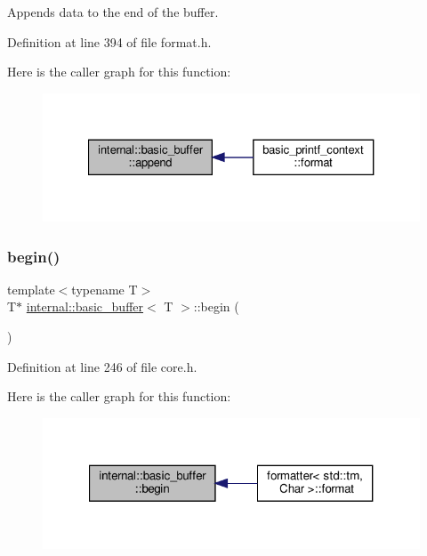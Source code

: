 Appends data to the end of the buffer. 

Definition at line 394 of file format.\+h.

Here is the caller graph for this function\+:
\nopagebreak
\begin{figure}[H]
\begin{center}
\leavevmode
\includegraphics[width=327pt]{classinternal_1_1basic__buffer_aba7ea1a95a28bc123712f2fd24cf7414_icgraph}
\end{center}
\end{figure}
\mbox{\label{classinternal_1_1basic__buffer_ae9d79a4d8c58625f46dfc48e95091bb4}} 
\subsubsection{\texorpdfstring{begin()}{begin()}}
{\footnotesize\ttfamily template$<$typename T$>$ \\
T$\ast$ \hyperlink{classinternal_1_1basic__buffer}{internal\+::basic\+\_\+buffer}$<$ T $>$\+::begin (\begin{DoxyParamCaption}{ }\end{DoxyParamCaption})\hspace{0.3cm}{\ttfamily [inline]}}



Definition at line 246 of file core.\+h.

Here is the caller graph for this function\+:
\nopagebreak
\begin{figure}[H]
\begin{center}
\leavevmode
\includegraphics[width=321pt]{classinternal_1_1basic__buffer_ae9d79a4d8c58625f46dfc48e95091bb4_icgraph}
\end{center}
\end{figure}
\mbox{\label{classinternal_1_1basic__buffer_ae88bfc1cb8c896fa0b689ad8158cccae}} 
